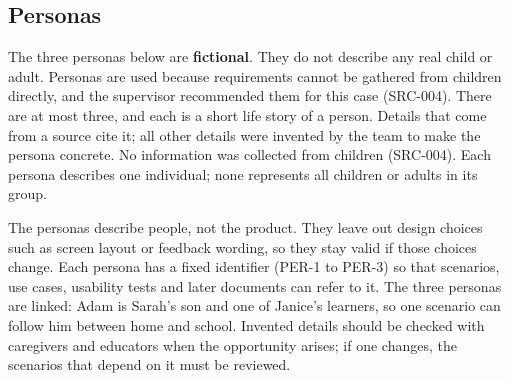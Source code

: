 \documentclass[12pt]{article}
\renewcommand{\_}{\textunderscore\allowbreak}%
\begin{document}
\subsection{Personas}

The three personas below are \textbf{fictional}. They do not describe any real
child or adult. Personas are used because requirements cannot be gathered from
children directly, and the supervisor recommended them for this case (SRC-004).
There are at most three, and each is a short life story of a person. Details
that come from a source cite it; all other details were invented by the team to
make the persona concrete. No information was collected from children (SRC-004).
Each persona describes one individual; none represents all children or adults in
its group.

The personas describe people, not the product. They leave out design choices
such as screen layout or feedback wording, so they stay valid if those choices
change. Each persona has a fixed identifier (PER-1 to PER-3) so that scenarios,
use cases, usability tests and later documents can refer to it. The three
personas are linked: Adam is Sarah's son and one of Janice's learners, so one
scenario can follow him between home and school. Invented details should be
checked with caregivers and educators when the opportunity arises; if one
changes, the scenarios that depend on it must be reviewed.
\end{document}
